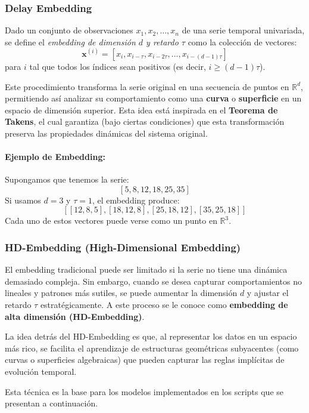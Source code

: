 \subsubsection*{Delay Embedding}

Dado un conjunto de observaciones $x_1, x_2, \dots, x_n$ de una serie temporal univariada, se define el \textit{embedding de dimensión $d$ y retardo $\tau$} como la colección de vectores:
\[
\mathbf{x}^{(i)} = [x_i, x_{i-\tau}, x_{i - 2\tau}, \dots, x_{i - (d-1)\tau}]
\]
para $i$ tal que todos los índices sean positivos (es decir, $i \geq (d-1)\tau$).

Este procedimiento transforma la serie original en una secuencia de puntos en $\mathbb{R}^d$, permitiendo así analizar su comportamiento como una \textbf{curva} o \textbf{superficie} en un espacio de dimensión superior. Esta idea está inspirada en el \textbf{Teorema de Takens}, el cual garantiza (bajo ciertas condiciones) que esta transformación preserva las propiedades dinámicas del sistema original.

\paragraph{Ejemplo de Embedding:} Supongamos que tenemos la serie:
\[
[5, 8, 12, 18, 25, 35]
\]
Si usamos $d = 3$ y $\tau = 1$, el embedding produce:
\[
[ [12, 8, 5], [18, 12, 8], [25, 18, 12], [35, 25, 18] ]
\]
Cada uno de estos vectores puede verse como un punto en $\mathbb{R}^3$.

\subsubsection*{HD-Embedding (High-Dimensional Embedding)}

El embedding tradicional puede ser limitado si la serie no tiene una dinámica demasiado compleja. Sin embargo, cuando se desea capturar comportamientos no lineales y patrones más sutiles, se puede aumentar la dimensión $d$ y ajustar el retardo $\tau$ estratégicamente. A este proceso se le conoce como \textbf{embedding de alta dimensión (HD-Embedding)}.

La idea detrás del HD-Embedding es que, al representar los datos en un espacio más rico, se facilita el aprendizaje de estructuras geométricas subyacentes (como curvas o superficies algebraicas) que pueden capturar las reglas implícitas de evolución temporal.

Esta técnica es la base para los modelos implementados en los scripts que se presentan a continuación.

